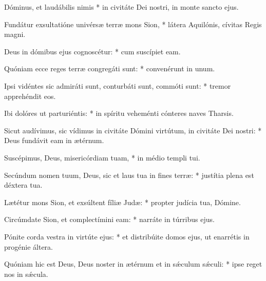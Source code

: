 \begin{psalmus}

     Dóminus, et laudábilis nimis * in civitáte Dei nostri, in monte sancto ejus.

    Fundátur exsultatióne univérsæ terræ mons Sion, * látera Aquilónis, cívitas Regis magni.

    Deus in dómibus ejus cognoscétur: * cum suscípiet eam.

    Quóniam ecce reges terræ congregáti sunt: * convenérunt in unum.

    Ipsi vidéntes sic admiráti sunt, conturbáti sunt, commóti sunt: * tremor apprehéndit eos.

    Ibi dolóres ut parturiéntis: * in spíritu veheménti cónteres naves Tharsis.

    Sicut audívimus, sic vídimus in civitáte Dómini virtútum, in civitáte Dei nostri: * Deus fundávit eam in ætérnum.

    Suscépimus, Deus, misericórdiam tuam, * in médio templi tui.

    Secúndum nomen tuum, Deus, sic et laus tua in fines terræ: * justítia plena est déxtera tua.

    Lætétur mons Sion, et exsúltent fíliæ Judæ: * propter judícia tua, Dómine.

    Circúmdate Sion, et complectímini eam: * narráte in túrribus ejus.

    Pónite corda vestra in virtúte ejus: * et distribúite domos ejus, ut enarrétis in progénie áltera.

    Quóniam hic est Deus, Deus noster in ætérnum et in sǽculum sǽculi: * ipse reget nos in sǽcula.

\end{psalmus}
